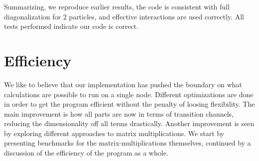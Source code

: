 Summarizing, we reproduce earlier results, the code is consistent with full diagonalization for $2$ particles, and effective interactions are used correctly.
All tests performed indicate our code is correct.



\section{Efficiency}
We like to believe that our implementation has pushed the boundary on what calculations are possible to run on a single node.
Different optimizations are done in order to get the program efficient without the penalty of loosing flexibility.
The main improvement is how all parts are now in terms of transition channels, reducing the dimensionality off all terms drastically.
Another improvement is seen by exploring different approaches to matrix multiplications. 
We start by presenting benchmarks for the matrix-multiplications themselves, continued by a discussion of the efficiency of the program as a whole.

